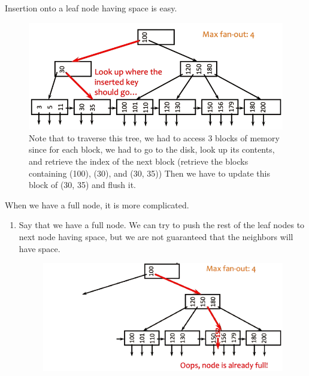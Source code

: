 \documentclass{article}
\begin{document}
      \begin{algo}[Insertion]
        Insertion onto a leaf node having space is easy. 
        
        \begin{figure}[H]
          \centering 
          \includegraphics[scale=0.4]{img/insertion_easy.png}
          \caption{Note that to traverse this tree, we had to access 3 blocks of memory since for each block, we had to go to the disk, look up its contents, and retrieve the index of the next block (retrieve the blocks containing (100), (30), and (30, 35)) Then we have to update this block of (30, 35) and flush it. }
          \label{fig:insertion_easy}
        \end{figure}

        When we have a full node, it is more complicated. 
        \begin{enumerate}
          \item Say that we have a full node. We can try to push the rest of the leaf nodes to next node having space, but we are not guaranteed that the neighbors will have space. 

          \begin{figure}[H]
            \centering 
            \includegraphics[scale=0.4]{img/insertion_1.png}
            \caption{} 
            \label{fig:insertion_1}
          \end{figure}


\end{enumerate}
\end{algo}
\end{document}
